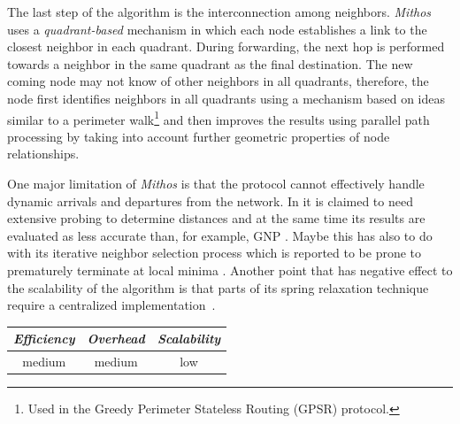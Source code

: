 The last step of the algorithm is the interconnection among neighbors. \emph{Mithos}
uses a \emph{quadrant-based} mechanism in which each node establishes
a link to the closest neighbor in each quadrant. During forwarding, the next
hop is performed towards a neighbor in the same quadrant as the final
destination. The new coming node may not know of other neighbors in all
quadrants, therefore, the node first identifies neighbors in all quadrants
using a mechanism based on ideas similar to a perimeter walk\footnote{Used in
the Greedy Perimeter Stateless Routing (GPSR) protocol.} and then improves the
results using parallel path processing by taking into account further geometric
properties of node relationships.

One major limitation of \emph{Mithos} is that the protocol cannot effectively
handle dynamic arrivals and departures from the network. In \cite{CCRK2004} it
is claimed to need extensive probing to determine distances and at the same time
its results are evaluated as less accurate than, for example,
GNP \cite{ng_gnp_2001}. Maybe this has also to do with its iterative neighbor
selection process which is reported to be prone to prematurely terminate at
local minima \cite{WSS2005}. Another point that has negative effect to the
scalability of the algorithm is that parts of its spring relaxation technique
require a centralized implementation~\cite{cox_vivaldi_2004}.

\begin{center}
\begin{tabular}{ccc}
\emph{Efficiency} & \emph{Overhead} & \emph{Scalability} \\
\hline
medium &
medium &
low
\end{tabular}
\end{center}

